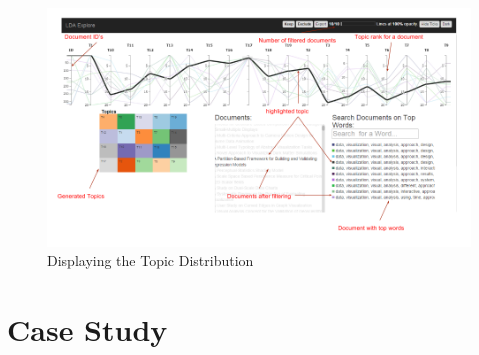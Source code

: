 \documentclass[10pt,journal,compsoc]{IEEEtran}
\begin{document}
\begin{figure}[!t]
\centering
\includegraphics[scale=0.5]{annotated_filtered}
\caption{Displaying the Topic Distribution}
\label{filtering}
\end{figure}

\section{Case Study}


%
%
\end{document}
